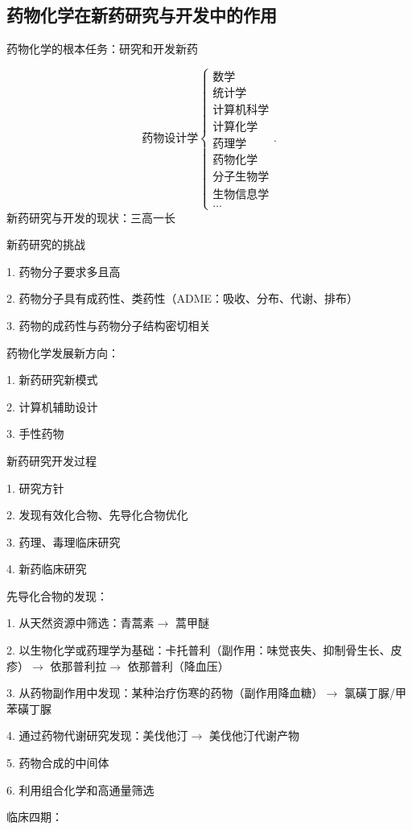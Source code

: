 \subsection{药物化学在新药研究与开发中的作用}%
\label{sub:药物化学在新药研究与开发中的作用}
\begin{notation}
    药物化学的根本任务：研究和开发新药
\end{notation}
\[
    \text{药物设计学}\begin{cases}
        \text{数学}\\
        \text{统计学}\\
        \text{计算机科学}\\
        \text{计算化学}\\
        \text{药理学}\\
        \text{药物化学}\\
        \text{分子生物学}\\
        \text{生物信息学}\\
        \ldots
    \end{cases}
.\] 
新药研究与开发的现状：三高一长
\begin{notation}
    新药研究的挑战

    1. 药物分子要求多且高

    2. 药物分子具有成药性、类药性（ADME：吸收、分布、代谢、排布）

    3. 药物的成药性与药物分子结构密切相关
\end{notation}
\begin{notation}
    药物化学发展新方向：

    1. 新药研究新模式

    2. 计算机辅助设计

    3. 手性药物
\end{notation}
\begin{notation}
    新药研究开发过程

    1. 研究方针

    2. 发现有效化合物、先导化合物优化

    3. 药理、毒理临床研究

    4. 新药临床研究
\end{notation}
\begin{eg}
    先导化合物的发现：

    1. 从天然资源中筛选：青蒿素$\to $ 蒿甲醚

    2. 以生物化学或药理学为基础：卡托普利（副作用：味觉丧失、抑制骨生长、皮疹）$\to $ 依那普利拉$\to $ 依那普利（降血压）

    3. 从药物副作用中发现：某种治疗伤寒的药物（副作用降血糖）$\to $ 氯磺丁脲/甲苯磺丁脲

    4. 通过药物代谢研究发现：美伐他汀$\to $ 美伐他汀代谢产物

    5. 药物合成的中间体

    6. 利用组合化学和高通量筛选
\end{eg}
临床四期：

